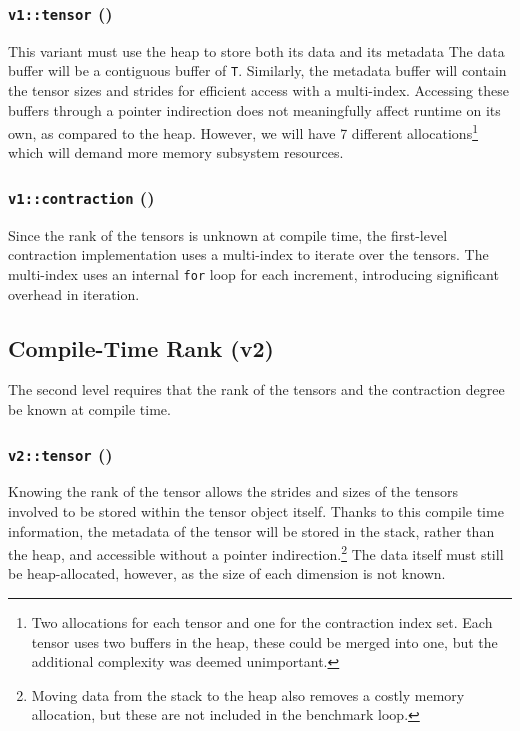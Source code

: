 \documentclass[conference]{IEEEtran}
\begin{document}
\subsubsection{\texttt{v1::tensor} ()}

This variant must use the heap to store both its data and its metadata
The data buffer will be a contiguous buffer of \texttt{T}.
Similarly, the metadata buffer will contain the tensor sizes and strides for
efficient access with a multi-index.
Accessing these buffers through a pointer indirection does not meaningfully
affect runtime on its own, as compared to the heap.
However, we will have 7 different allocations\footnote{Two allocations for each
    tensor and one for the contraction index set. Each tensor uses two buffers
    in the heap, these could be merged into one, but the additional complexity
was deemed unimportant.} which will demand more memory subsystem resources.

\subsubsection{\texttt{v1::contraction} ()}

Since the rank of the tensors is unknown at compile time, the first-level
contraction implementation uses a multi-index to iterate over the tensors.
The multi-index uses an internal \texttt{for} loop for each increment,
introducing significant overhead in iteration.

\subsection{Compile-Time Rank (v2)}

The second level requires that the rank of the tensors and the contraction
degree be known at compile time.

\subsubsection{\texttt{v2::tensor} ()}

Knowing the rank of the tensor allows the strides and sizes of the tensors
involved to be stored within the tensor object itself.
Thanks to this compile time information, the metadata of the tensor will be
stored in the stack, rather than the heap, and accessible without a pointer
indirection.\footnote{Moving data from the stack to the heap also removes a
costly memory allocation, but these are not included in the benchmark loop.}
The data itself must still be heap-allocated, however, as the size of each
dimension is not known.
\end{document}
